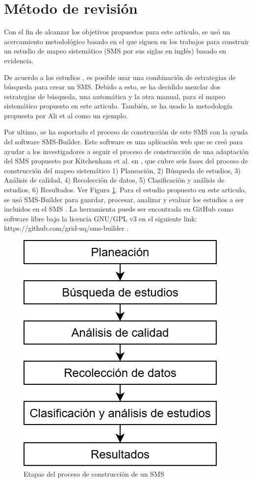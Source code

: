 \section{Método de revisión}\label{sec:metodo-revision}
Con el fin de alcanzar los objetivos propuestos para este articulo, se usó un acercamiento metodológico basado en el que siguen en los trabajos \cite{Kitchenham2010792, budgen2008using} para construir un estudio de mapeo sistemático (SMS por sus siglas en inglés) basado en evidencia.

De acuerdo a los estudios \cite{Erica2017HybridSS, Nguyen201562}, es posible usar una combinación de estrategias de búsqueda para crear un SMS. Debido a esto, se ha decidido mezclar dos estrategias de búsqueda, una automática y la otra manual, para el mapeo sistemático propuesto en este articulo. También, se ha usado la metodología propuesta por Ali et al \cite{Ali201988196} como un ejemplo.

Por ultimo, se ha soportado el proceso de construcción de este SMS con la ayuda del software SMS-Builder. Este software es una aplicación web que se creó para ayudar a los investigadores a seguir el proceso de construcción de una adaptación del SMS propuesto por Kitchenham et al. en \cite{Kitchenham2010792}, que cubre seis fases del proceso de construcción del mapeo sistemático 1) Planeación, 2) Búsqueda de estudios, 3) Análisis de calidad, 4) Recolección de datos, 5) Clasificación y análisis de estudios, 6) Resultados. Ver Figura \ref{figure:Stages}.
Para el estudio propuesto en este articulo, se usó SMS-Builder para guardar, procesar, analizar y evaluar los estudios a ser incluidos en el SMS \cite{Candela2022100935}. La herramienta puede ser encontrada en GitHub como software libre bajo la licencia GNU/GPL v3 en el siguiente link: https://github.com/grid-uq/sms-builder \cite{Candela2022100935}.

\begin{figure}[htbp]
	\centering
	\includegraphics[width=0.6\linewidth]{resources/figures/sms-Etapas.drawio.png}
	\caption{Etapas del proceso de construcción de un SMS}
	\label{figure:Stages}
\end{figure}

